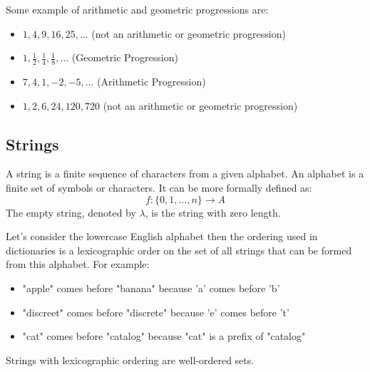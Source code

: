\begin{eg}
    Some example of arithmetic and geometric progressions are:
    \begin{itemize}[itemsep=1pt,label=$\circ$]
        \item $1,4,9,16,25,\ldots$ (not an arithmetic or geometric progression)
        \item $1,\frac{1}{2},\frac{1}{4},\frac{1}{8},\ldots$ (Geometric Progression)
        \item $7,4,1,-2,-5,\ldots$ (Arithmetic Progression)
        \item $1,2,6,24,120,720$ (not an arithmetic or geometric progression)
    \end{itemize}
\end{eg}

\subsection{Strings}
\begin{definition}[Strings]
    A string is a finite sequence of characters from a given alphabet. An alphabet is a finite set of symbols or characters. It can be more formally defined as:
    \[
        f: \{0,1,\ldots, n\} \to A
    \]
    The empty string, denoted by $\lambda$, is the string with zero length.
\end{definition}

\begin{eg}
    Let's consider the lowercase English alphabet then the ordering used in dictionaries is a lexicographic order on the set of all strings that can be formed from this alphabet. For example:
    \begin{itemize}[itemsep=1pt,label=$\circ$]
        \item "apple" comes before "banana" because 'a' comes before 'b'
        \item "discreet" comes before "discrete" because 'e' comes before 't'
        \item "cat" comes before "catalog" because "cat" is a prefix of "catalog"
    \end{itemize}
    Strings with lexicographic ordering are well-ordered sets.
\end{eg}

